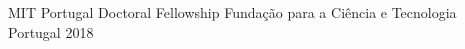 
\begin{cvhonors}

  \cvhonor
    {MIT Portugal Doctoral Fellowship} %
    {Fundação para a Ciência e Tecnologia} %
    {Portugal} %
    {2018} %

\end{cvhonors}
